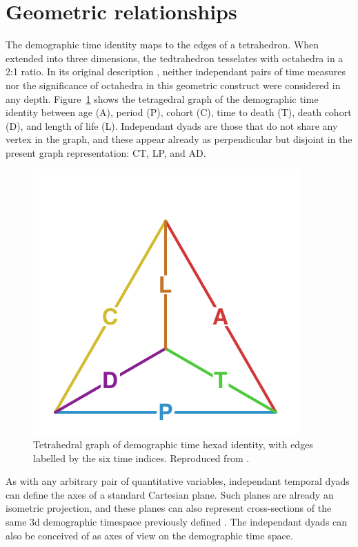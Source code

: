 \section{Geometric relationships}
The demographic time identity maps to the edges of a tetrahedron. When extended
into three dimensions, the tedtrahedron tesselates with octahedra in a 2:1
ratio. In its original description \citep{riffe2017demographictime}, neither
independant pairs of time measures nor the significance of octahedra in this
geometric construct were considered in any depth. Figure~\ref{fig:tet}
shows the tetragedral graph of the demographic time identity between age
(A), period (P), cohort (C), time to death (T), death cohort (D), and length
of life (L). Independant dyads are those that do not share any vertex in the
graph, and these appear already as perpendicular but disjoint in the present
graph representation: CT, LP, and AD.

\begin{figure}[h!]
\centering
\caption{Tetrahedral graph of demographic time hexad identity, with edges
labelled by the six time indices. Reproduced from 
\citet{riffe2017demographictime}.}
\label{fig:tet}
\includegraphics[width=4in]{Figures/TetraHedronEdgesOnly.pdf}%
\end{figure}

As with any arbitrary pair of quantitative variables, independant
temporal dyads can define the axes of a standard Cartesian plane. Such planes
are already an isometric projection, and these planes can also represent
cross-sections of the same 3d demographic timespace previously defined
\citep{riffe2017demographictime}.
The independant dyads can also be conceived of as axes of view on the
demographic time space.

